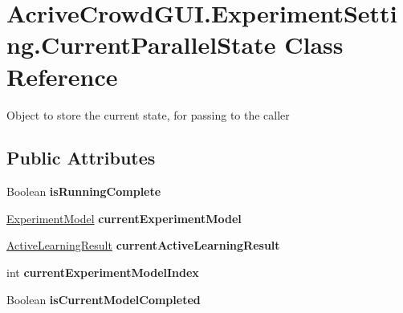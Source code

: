 \hypertarget{class_acrive_crowd_g_u_i_1_1_experiment_setting_1_1_current_parallel_state}{}\section{Acrive\+Crowd\+G\+U\+I.\+Experiment\+Setting.\+Current\+Parallel\+State Class Reference}
\label{class_acrive_crowd_g_u_i_1_1_experiment_setting_1_1_current_parallel_state}


Object to store the current state, for passing to the caller  


\subsection*{Public Attributes}
\begin{DoxyCompactItemize}
\item 
\hypertarget{class_acrive_crowd_g_u_i_1_1_experiment_setting_1_1_current_parallel_state_ab66429da01574542601454c810f03eac}{}Boolean {\bfseries is\+Running\+Complete}\label{class_acrive_crowd_g_u_i_1_1_experiment_setting_1_1_current_parallel_state_ab66429da01574542601454c810f03eac}

\item 
\hypertarget{class_acrive_crowd_g_u_i_1_1_experiment_setting_1_1_current_parallel_state_ab2f5863ca9240c4b42b5698e59d8f1cc}{}\hyperlink{class_acrive_crowd_g_u_i_1_1_experiment_model}{Experiment\+Model} {\bfseries current\+Experiment\+Model}\label{class_acrive_crowd_g_u_i_1_1_experiment_setting_1_1_current_parallel_state_ab2f5863ca9240c4b42b5698e59d8f1cc}

\item 
\hypertarget{class_acrive_crowd_g_u_i_1_1_experiment_setting_1_1_current_parallel_state_a67ef765ed44b0e69ea36854eab7fd96f}{}\hyperlink{class_crowdsourcing_models_1_1_active_learning_result}{Active\+Learning\+Result} {\bfseries current\+Active\+Learning\+Result}\label{class_acrive_crowd_g_u_i_1_1_experiment_setting_1_1_current_parallel_state_a67ef765ed44b0e69ea36854eab7fd96f}

\item 
\hypertarget{class_acrive_crowd_g_u_i_1_1_experiment_setting_1_1_current_parallel_state_a63562d67bb026a74de771f162dfce8a6}{}int {\bfseries current\+Experiment\+Model\+Index}\label{class_acrive_crowd_g_u_i_1_1_experiment_setting_1_1_current_parallel_state_a63562d67bb026a74de771f162dfce8a6}

\item 
\hypertarget{class_acrive_crowd_g_u_i_1_1_experiment_setting_1_1_current_parallel_state_a2cbcb95d13d94f7e0823371bb9ac62ef}{}Boolean {\bfseries is\+Current\+Model\+Completed}\label{class_acrive_crowd_g_u_i_1_1_experiment_setting_1_1_current_parallel_state_a2cbcb95d13d94f7e0823371bb9ac62ef}

\end{DoxyCompactItemize}


